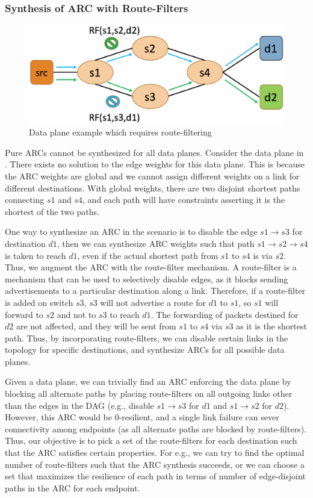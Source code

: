 \subsubsection{Synthesis of ARC with Route-Filters} \label{sec:routefilter}
\begin{figure}[h!] 
	\centering
	\includegraphics[width=0.8\columnwidth]{figures/diamond.eps}
	\caption{Data plane example which requires route-filtering} \label{fig:diamond}
\end{figure}
Pure ARCs cannot be synthesized for all data planes. Consider the data
plane in . 
There exists no solution to the edge weights for this data plane. 
This is because the ARC weights are global and we cannot
assign different weights on a link for different destinations.  
With global weights, there are two disjoint shortest paths connecting 
$s1$ and $s4$, and each path will have 
constraints
asserting it is the shortest of the two paths. 

One way to synthesize an ARC in the scenario 
is to disable the edge
$s1 \rightarrow s3$ for destination $d1$, 
then we can synthesize ARC weights
such that path $s1 \rightarrow s2 \rightarrow s4$
 is taken to reach $d1$, 
even if the actual shortest path
from $s1$ to $s4$ is via $s2$. Thus, we augment 
the ARC with the route-filter mechanism. 
A route-filter is a mechanism 
that can be used to selectively disable
edges, as it blocks sending advertisements to a
particular destination along a link. 
Therefore, if a route-filter is added on switch $s3$, 
$s3$ 
will not advertise a route for $d1$ to $s1$, so 
$s1$ will forward to $s2$ and not to $s3$
to reach $d1$. The forwarding of packets destined
for $d2$ are not affected, and they will be sent from
$s1$ to $s4$ via $s3$ as it is the shortest path.
Thus, by incorporating route-filters, we can
disable certain links in the topology 
for specific destinations, and synthesize
ARCs for all possible data planes. 

Given a data plane, we can trivially find an 
ARC enforcing the data plane by blocking all alternate
paths by placing 
route-filters on all outgoing links other than the edges
in the DAG (e.g., disable $s1 \rightarrow s3$ for $d1$
and $s1 \rightarrow s2$ for $d2$). However, this 
ARC would be
0-resilient, and a single link failure can sever 
connectivity among endpoints (as all alternate paths
are blocked by route-filters). Thus, our objective is
to pick a set of the route-filters for each destination
such that the 
ARC satisfies certain properties. For e.g., we can
try to find the optimal number of route-filters such 
that the ARC synthesis succeeds, or we can choose a
set that maximizes the resilience of each path 
in terms of number of edge-disjoint paths in the ARC
for each endpoint. 

